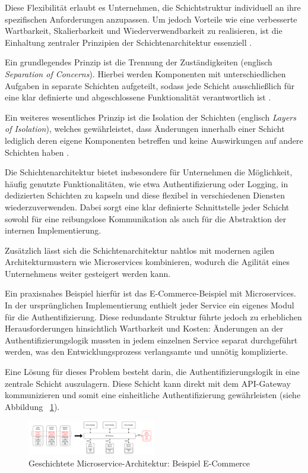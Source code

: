 \documentclass[acmtog]{acmart}
\begin{document}
Diese Flexibilität erlaubt es Unternehmen, die Schichtstruktur individuell an ihre
spezifischen Anforderungen anzupassen. Um jedoch Vorteile wie eine verbesserte Wartbarkeit,
Skalierbarkeit und Wiederverwendbarkeit zu realisieren, ist die Einhaltung zentraler
Prinzipien der Schichtenarchitektur essenziell \cite[34]{layered2}.

Ein grundlegendes Prinzip ist die Trennung der Zuständigkeiten (englisch \textit{Separation
of Concerns}). Hierbei werden Komponenten mit unterschiedlichen Aufgaben in separate Schichten
aufgeteilt, sodass jede Schicht ausschließlich für eine klar definierte und abgeschlossene
Funktionalität verantwortlich ist \cite[34]{layered2}.

Ein weiteres wesentliches Prinzip ist die Isolation der Schichten (englisch \textit{Layers
of Isolation}), welches gewährleistet, dass Änderungen innerhalb einer Schicht lediglich
deren eigene Komponenten betreffen und keine Auswirkungen auf andere Schichten haben \cite[3–4]{architecturePatterns}.

Die Schichtenarchitektur bietet insbesondere für Unternehmen die Möglichkeit, häufig genutzte
Funktionalitäten, wie etwa Authentifizierung oder Logging, in dedizierten Schichten zu kapseln
und diese flexibel in verschiedenen Diensten wiederzuverwenden. Dabei sorgt eine klar definierte
Schnittstelle jeder Schicht sowohl für eine reibungslose Kommunikation als auch für die
Abstraktion der internen Implementierung.

Zusätzlich lässt sich die Schichtenarchitektur nahtlos mit modernen agilen Architekturmustern
wie Microservices kombinieren, wodurch die Agilität eines Unternehmens weiter gesteigert werden
kann.

Ein praxisnahes Beispiel hierfür ist das E-Commerce-Beispiel mit Microservices.
In der ursprünglichen Implementierung enthielt jeder Service ein eigenes Modul für die Authentifizierung. Diese
redundante Struktur führte jedoch zu erheblichen Herausforderungen hinsichtlich Wartbarkeit
und Kosten: Änderungen an der Authentifizierungslogik mussten in jedem einzelnen Service separat
durchgeführt werden, was den Entwicklungsprozess verlangsamte und unnötig komplizierte.

Eine Lösung für dieses Problem besteht darin, die Authentifizierungslogik in eine zentrale
Schicht auszulagern.
Diese Schicht kann direkt mit dem API-Gateway kommunizieren
und somit eine einheitliche Authentifizierung gewährleisten (siehe Abbildung ~\ref{fig:layered}).

\begin{figure}[h!]
  \centering
  \includegraphics[width=0.5\textwidth]{images/layered/ecommerce-example}
  \caption{Geschichtete Microservice-Architektur: Beispiel E-Commerce}
  \label{fig:layered}
\end{figure}
\end{document}
